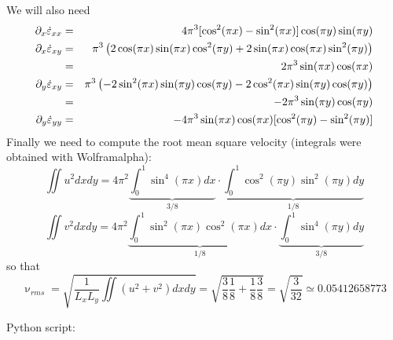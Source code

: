 We will also need 
\begin{eqnarray}
\partial_x \dot\varepsilon_{xx} &=& 4\pi^3 [\cos^2(\pi x)-\sin^2(\pi x)] \cos(\pi y) \sin(\pi y)  \nonumber\\
\partial_x \dot\varepsilon_{xy} 
&=& \pi^3 \left(2 \cos(\pi x) \sin(\pi x) \cos^2(\pi y) + 2\sin(\pi x) \cos(\pi x) \sin^2(\pi y)  \right) \nonumber\\
&=& 2 \pi^3 \sin(\pi x) \cos(\pi x) \nonumber\\
\partial_y \dot\varepsilon_{xy} 
&=& \pi^3 \left( -2\sin^2(\pi x) \sin(\pi y)\cos(\pi y) - 2\cos^2(\pi x) \sin(\pi y)\cos(\pi y)  \right)  \nonumber\\
&=& -2 \pi^3 \sin(\pi y) \cos(\pi y) \nonumber\\
\partial_y \dot\varepsilon_{yy} &=& 
-4\pi^3  \sin(\pi x) \cos(\pi x) [\cos^2(\pi y)- \sin^2(\pi y) ] \nonumber
\end{eqnarray}
Finally we need to compute the root mean square velocity (integrals were obtained with Wolframalpha):
\[
\iint u^2 dxdy 
= 4 \pi^2 
\underbrace{\int_0^1  \sin^4(\pi x) dx}_{3/8} 
\cdot  
\underbrace{\int_0^1 \cos^2(\pi y) \sin^2(\pi y) dy}_{1/8}
\]
\[
\iint v^2 dxdy 
= 4\pi^2 
\underbrace{\int_0^1 \sin^2(\pi x) \cos^2(\pi x) dx}_{1/8} \cdot \underbrace{\int_0^1 \sin^4(\pi y) dy}_{3/8} 
\]
so that 
\[
\upnu_{rms}=\sqrt{ \frac{1}{L_xL_y} \iint (u^2+v^2) dxdy   } = \sqrt{ \frac38\frac18+\frac18\frac38  }
=\sqrt{ \frac{3}{32}} \simeq 0.05412658773
\]

Python script: 
